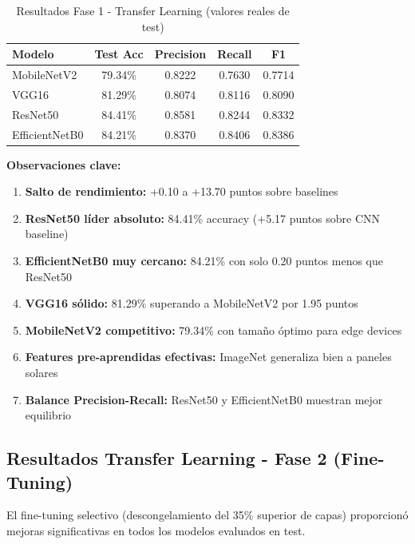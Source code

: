 \documentclass[11pt, a4paper]{article}
\begin{document}
\begin{table}[H]
\centering
\caption{Resultados Fase 1 - Transfer Learning (valores reales de test)}
\label{tab:tl_phase1_results}
\begin{tabular}{@{}lcccc@{}}
\toprule
\textbf{Modelo} & \textbf{Test Acc} & \textbf{Precision} & \textbf{Recall} & \textbf{F1} \\
\midrule
MobileNetV2    & 79.34\%        & 0.8222         & 0.7630      & 0.7714 \\
VGG16          & 81.29\%        & 0.8074         & 0.8116      & 0.8090 \\
ResNet50       & 84.41\%        & 0.8581         & 0.8244      & 0.8332 \\
EfficientNetB0 & 84.21\%        & 0.8370         & 0.8406      & 0.8386 \\
\bottomrule
\end{tabular}
\end{table}

\textbf{Observaciones clave:}

\begin{enumerate}
    \item \textbf{Salto de rendimiento:} +0.10 a +13.70 puntos sobre baselines
    \item \textbf{ResNet50 líder absoluto:} 84.41\% accuracy (+5.17 puntos sobre CNN baseline)
    \item \textbf{EfficientNetB0 muy cercano:} 84.21\% con solo 0.20 puntos menos que ResNet50
    \item \textbf{VGG16 sólido:} 81.29\% superando a MobileNetV2 por 1.95 puntos
    \item \textbf{MobileNetV2 competitivo:} 79.34\% con tamaño óptimo para edge devices
    \item \textbf{Features pre-aprendidas efectivas:} ImageNet generaliza bien a paneles solares
    \item \textbf{Balance Precision-Recall:} ResNet50 y EfficientNetB0 muestran mejor equilibrio
\end{enumerate}

\subsection{Resultados Transfer Learning - Fase 2 (Fine-Tuning)}

El fine-tuning selectivo (descongelamiento del 35\% superior de capas) proporcionó mejoras significativas en todos los modelos evaluados en test.
\end{document}
